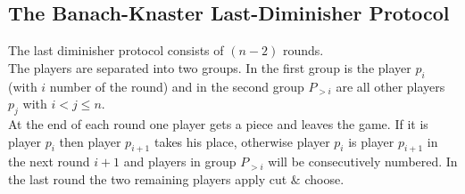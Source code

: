\subsection{The Banach-Knaster Last-Diminisher Protocol}

The last diminisher protocol consists of $(n-2)$ rounds.\\The players are separated into two groups. In the first group is the player $p_i$ (with $i$ number of the round) and in the second group $P_{>i}$ are all other players $p_j$ with $i <j\leq n$.\\ At the end of each round one player gets a piece and leaves the game. If it is player $p_i$ then player $p_{i+1}$ takes his place, otherwise player $p_i$ is player $p_{i+1}$ in the next round $i+1$ and players in group $P_{>i}$ will be consecutively numbered. In the last round the two remaining players apply cut $\&$ choose. 

